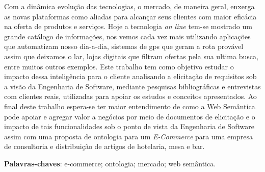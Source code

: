 \begin{resumo}

Com a dinâmica evolução das tecnologias, o mercado, de maneira geral,
 enxerga as novas plataformas como aliadas para alcançar seus clientes com maior
 eficácia na oferta de produtos e serviços. Hoje a tecnologia \textit{on line}
 tem-se mostrado um grande catálogo de informações, nos vemos cada vez
 mais utilizando aplicações que automatizam nosso dia-a-dia, sistemas de gps
 que geram a rota provável assim que deixamos o lar, lojas digitais que filtram
 ofertas pela sua ultima busca, entre muitos outros exemplos. Este trabalho tem
 como objetivo estudar o impacto dessa inteligência para o cliente
 analisando a elicitação de requisitos sob a visão da Engenharia de 
 Software, mediante pesquisas  bibliográficas e entrevistas com clientes  reais, utilizadas para apoiar
 os estudos e conceitos apresentados. Ao final deste trabalho espera-se ter maior
 entendimento de como a Web Semântica pode apoiar e agregar valor a negócios 
 por meio de documentos de elicitação e o impacto de tais funcionalidades sob o ponto de vista
 da Engenharia de Software assim com uma proposta de ontologia para
 um \textit{E-Commerce} para uma empresa de consultoria e distribuição de artigos de hotelaria, mesa e bar.

 \vspace{\onelineskip}
    
 \noindent
 \textbf{Palavras-chaves}: e-commerce; ontologia; mercado; web semântica.
\end{resumo}
